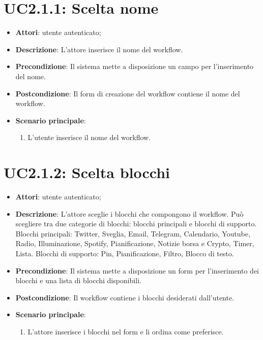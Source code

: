 \section{UC2.1.1: Scelta nome}
\label{UC2.1.1}
\begin{itemize}
	\item \textbf{Attori}: utente autenticato;
	\item \textbf{Descrizione}: L'attore inserisce il nome del workflow.
	\item \textbf{Precondizione}: Il sistema mette a disposizione un campo per l'inserimento del nome.
	\item \textbf{Postcondizione}: Il form di creazione del workflow contiene il nome del workflow.
	\item \textbf{Scenario principale}:
	\begin{enumerate} \item L'utente inserisce il nome del workflow.\end{enumerate}
\end{itemize}

\section{UC2.1.2: Scelta blocchi}
\label{UC2.1.2}
\begin{itemize}
	\item \textbf{Attori}: utente autenticato;
	\item \textbf{Descrizione}: L'attore sceglie i blocchi che compongono il workflow. Può scegliere tra due categorie di blocchi: blocchi principali e blocchi di supporto.
	Blocchi principali: Twitter, Sveglia, Email, Telegram, Calendario, Youtube, Radio, Illuminazione, Spotify, Pianificazione, Notizie borsa e Crypto, Timer, Lista.
	Blocchi di supporto: Pin, Pianificazione, Filtro, Blocco di testo.
	\item \textbf{Precondizione}: Il sistema mette a disposizione un form per l'inserimento dei blocchi e una lista di blocchi disponibili.
	\item \textbf{Postcondizione}: Il workflow contiene i blocchi desiderati dall'utente.
	\item \textbf{Scenario principale}:
	\begin{enumerate} \item L'attore inserisce i blocchi nel form e li ordina come preferisce.\end{enumerate}
\end{itemize}

